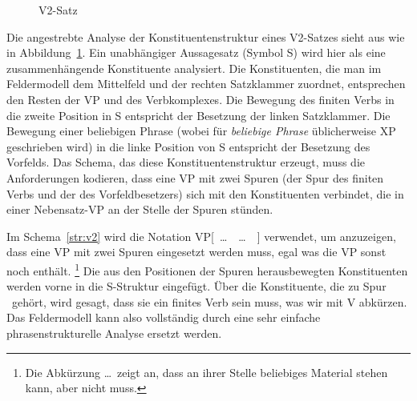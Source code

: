 \begin{figure}[!htbp]
  \caption{V2-Satz}
  \label{fig:v2satz}
\end{figure}


\Enl

Die angestrebte Analyse der Konstituentenstruktur eines V2-Satzes sieht aus wie in Abbildung~\ref{fig:v2satz}.
Ein unabhängiger Aussagesatz (Symbol S) wird hier als eine zusammenhängende Konstituente analysiert.
Die Konstituenten, die man im Feldermodell dem Mittelfeld und der rechten Satzklammer zuordnet, entsprechen den Resten der VP und des Verbkomplexes.
Die Bewegung des finiten Verbs in die zweite Position in S entspricht der Besetzung der linken Satzklammer.
Die Bewegung einer beliebigen Phrase (wobei für \textit{beliebige Phrase} üblicherweise XP geschrieben wird) in die linke Position von S entspricht der Besetzung des Vorfelds.
Das Schema, das diese Konstituentenstruktur erzeugt, muss die Anforderungen kodieren, dass eine VP mit zwei Spuren (der Spur des finiten Verbs und der des Vorfeldbesetzers) sich mit den Konstituenten verbindet, die in einer Nebensatz-VP an der Stelle der Spuren stünden.

\Np


Im Schema~\ref{str:v2} wird die Notation VP[~\ldots~\Tii~\ldots~\Ti~] verwendet, um anzuzeigen, dass eine VP mit zwei Spuren eingesetzt werden muss, egal was die VP sonst noch enthält.%
\footnote{Die Abkürzung \ldots\ zeigt an, dass an ihrer Stelle beliebiges Material stehen kann, aber nicht muss.}
Die aus den Positionen der Spuren herausbewegten Konstituenten werden vorne in die S-Struktur eingefügt.
Über die Konstituente, die zu Spur \Ti\ gehört, wird gesagt, dass sie ein finites Verb sein muss, was wir mit V abkürzen.
Das Feldermodell kann also vollständig durch eine sehr einfache phrasenstrukturelle Analyse ersetzt werden.

